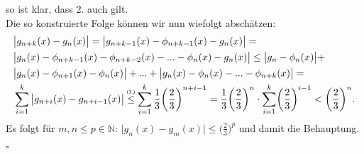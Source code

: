 \documentclass[11pt,leqno]{article}
\newcommand{\N}{\mathbb{N}}
\newcommand\myleqq{\mathrel{\overset{\makebox[0pt]{\mbox{\normalfont\tiny\sffamily (3.)}}}{\leq}}}
\begin{document}
so ist klar, dass 2. auch gilt. \\
Die so konstruierte Folge können wir nun wiefolgt abschätzen:
\begin{align}
    &\big\vert g_{n+k}(x)-g_n(x)\big\vert = \big\vert g_{n+k-1}(x)-\phi_{n+k-1}(x)-g_n(x)\big\vert = \notag\\
    &\big\vert g_{n}(x)-\phi_{n+k-1}(x)-\phi_{n+k-2}(x)- ... -\phi_n(x)-g_n(x) \big\vert \leq \big\vert g_n-\phi_n(x)\big\vert + \notag\\
    &\big\vert g_n(x)-\phi_{n+1}(x)-\phi_{n}(x)\big\vert + ... + 
    \big\vert g_n(x)-\phi_n(x)- ... -\phi_{n+k}(x)\big\vert = \notag\\
    &\sum_{i=1}^{k} \big\vert g_{n+i}(x)-g_{n+i-1}(x)\big\vert \myleqq \sum_{i=1}^{k}\frac{1}{3}\biggl(\frac{2}{3}\biggr)^{n+i-1}
    = \frac{1}{3}\biggl(\frac{2}{3}\biggr)^n \cdot \sum_{i=1}^{k}\biggl(\frac{2}{3}\biggr)^{i-1} <\biggl(\frac{2}{3}\biggr)^n.
    \notag 
\end{align}
Es folgt für $m,n \leq p \in \N$: $\big\vert g_n(x)-g_m(x) \big\vert \leq \big(\frac{2}{3}\big)^p$ und damit die Behauptung.
\begin{flushright}
    $\square$
\end{flushright}
\end{document}
